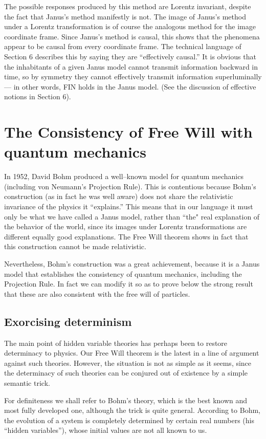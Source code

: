 \documentclass[12pt]{amsart}
\begin{document}
The possible responses produced by this method are Lorentz invariant,
despite the fact that Janus's method manifestly is not.  The image of
Janus's method under a Lorentz transformation is of course the analogous
method for the image coordinate frame.  Since Janus's method is causal,
this shows that the phenomena appear to be causal from every coordinate
frame. The technical language of Section 6 describes this by 
saying they are ``effectively causal.''  It is 
obvious that the inhabitants of a given Janus model cannot transmit
information backward in time, so by symmetry they cannot effectively
transmit information superluminally --- in other words, FIN holds in
the Janus model. (See the discussion of effective notions in Section 6).

\section{The Consistency of Free Will with quantum mechanics}%
In 1952, David Bohm produced a well--known model for quantum 
mechanics (including von Neumann's Projection Rule). 
 This is contentious because Bohm's construction 
(as in fact  he was well aware) does not share the relativistic 
invariance of the physics it ``explains.'' This means that in 
our language it must only be what we have  called a Janus model,
rather than ``the" real explanation of the behavior of the world,
since its images under Lorentz transformations are different equally 
good explanations.  The Free Will theorem shows in fact that 
this construction cannot be made relativistic.

Nevertheless, Bohm's construction was a great achievement, because it is
a Janus model that establishes the consistency of quantum mechanics, 
including the Projection Rule. In fact we can modify it so as 
to prove below the strong result that these are also consistent with the
free will of particles.

\subsection{ Exorcising determinism}%
 The main point of hidden variable theories has perhaps been to restore 
determinacy to physics.  Our Free Will theorem is the latest in 
a line of argument against such theories.  However, the situation 
is not as simple as it seems, since the determinacy of such theories 
can be conjured out of existence by a simple semantic trick. 

For definiteness we shall refer to Bohm's theory, which is the best
known and most fully developed one, although the trick is quite general.
According to Bohm, the evolution of a system is completely determined
by certain real numbers (his ``hidden variables''),  whose initial values 
are not all known to us. 
\end{document}
